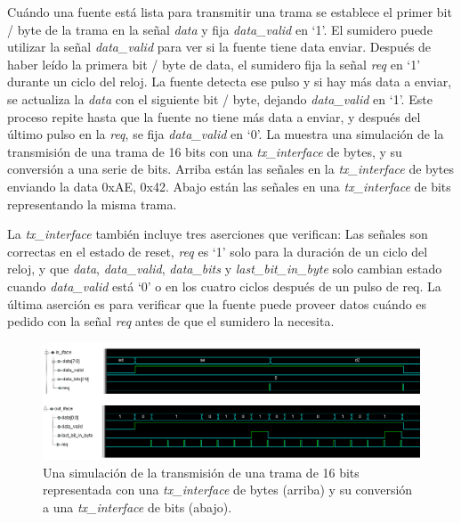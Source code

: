 \documentclass[a4paper, twoside, 11pt]{report}
\begin{document}
Cuándo una fuente está lista para transmitir una trama se establece el primer bit / byte de la trama en la señal \textit{data} y fija \textit{data\_valid} en ‘1’. El sumidero puede utilizar la señal \textit{data\_valid} para ver si la fuente tiene data enviar. Después de haber leído la primera bit / byte de data, el sumidero fija la señal \textit{req} en ‘1’ durante un ciclo del reloj. La fuente detecta ese pulso y si hay más data a enviar, se actualiza la \textit{data} con el siguiente bit / byte, dejando \textit{data\_valid} en ‘1’. Este proceso repite hasta que la fuente no tiene más data a enviar, y después del último pulso en la \textit{req}, se fija \textit{data\_valid} en ‘0’. La  muestra una simulación de la transmisión de una trama de 16 bits con una \textit{tx\_interface} de bytes, y su conversión a una serie de bits. Arriba están las señales en la \textit{tx\_interface} de bytes enviando la data 0xAE, 0x42. Abajo están las señales en una \textit{tx\_interface} de bits representando la misma trama.

La \textit{tx\_interface} también incluye tres aserciones que verifican: Las señales son correctas en el estado de reset, \textit{req} es ‘1’ solo para la duración de un ciclo del reloj, y que \textit{data}, \textit{data\_valid}, \textit{data\_bits} y \textit{last\_bit\_in\_byte} solo cambian estado cuando \textit{data\_valid} está ‘0’ o en los cuatro ciclos después de un pulso de req. La última aserción es para verificar que la fuente puede proveer datos cuándo es pedido con la señal \textit{req} antes de que el sumidero la necesita.

\begin{figure}[htb]
  \centering
  \includegraphics[width=1.0\textwidth]{./img/tx_iface_example}
  \caption{Una simulación de la transmisión de una trama de 16 bits representada con una \textit{tx\_interface} de bytes (arriba) y su conversión a una \textit{tx\_interface} de bits (abajo).}
  \label{fig:tx_iface}
\end{figure}


\FloatBarrier
\end{document}
